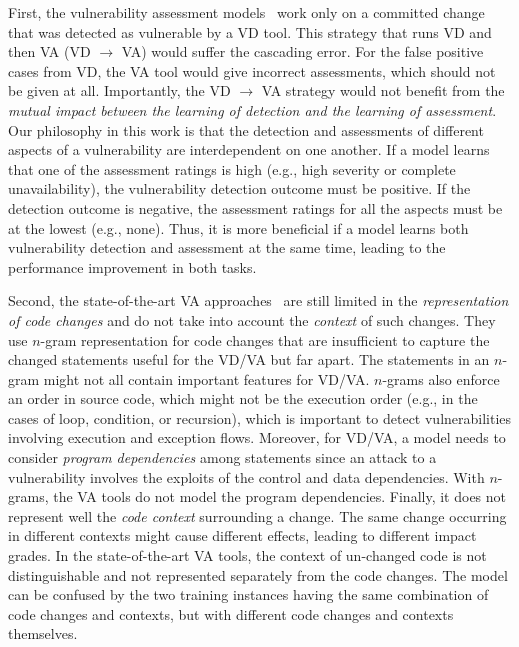 First, the vulnerability assessment models~\cite{deepCVA-ase21} work
only on a committed change that was detected as vulnerable by a VD
tool. This strategy that runs VD and then VA (VD $\rightarrow$ VA)
would suffer the cascading error. For the false positive cases from
VD, the VA tool would give incorrect assessments, which should not be
given at all. Importantly, the VD $\rightarrow$ VA strategy would not
benefit from the {\em mutual impact between the learning of detection
  and the learning of assessment}. Our philosophy in this work is that
the detection and assessments of different aspects of a vulnerability
are interdependent on one another. If a model learns that one of the
assessment ratings is high (e.g., high severity or complete
unavailability), the vulnerability detection outcome must be
positive. If the detection outcome is negative, the assessment ratings
for all the aspects must be at the lowest (e.g., none). Thus, it is
more beneficial if a model learns both vulnerability detection and
assessment at the same time, leading to the performance improvement in
both tasks.

Second, the state-of-the-art VA approaches~\cite{deepCVA-ase21} are
still limited in the {\em representation of code changes} and do not
take into account the {\em context} of such changes. They use $n$-gram
representation for code changes that are insufficient to capture the
changed statements useful for the VD/VA but far apart. The statements
in an $n$-gram might not all contain important features for
VD/VA. $n$-grams also enforce an order in source code, which might not
be the execution order (e.g., in the cases of loop, condition, or
recursion), which is important to detect vulnerabilities involving
execution and exception flows. Moreover, for VD/VA, a model needs to
consider {\em program dependencies} among statements since an attack
to a vulnerability involves the exploits of the control and data
dependencies. With $n$-grams, the VA tools do not model the program
dependencies. Finally, it does not represent well the {\em code
  context} surrounding a change. The same change occurring in
different contexts might cause different effects, leading to different
impact grades. In the state-of-the-art VA tools, the context of
un-changed code is not distinguishable and not represented separately
from the code changes. The model can be confused by the two training
instances having the same combination of code changes and contexts,
but with different code changes and contexts themselves.

